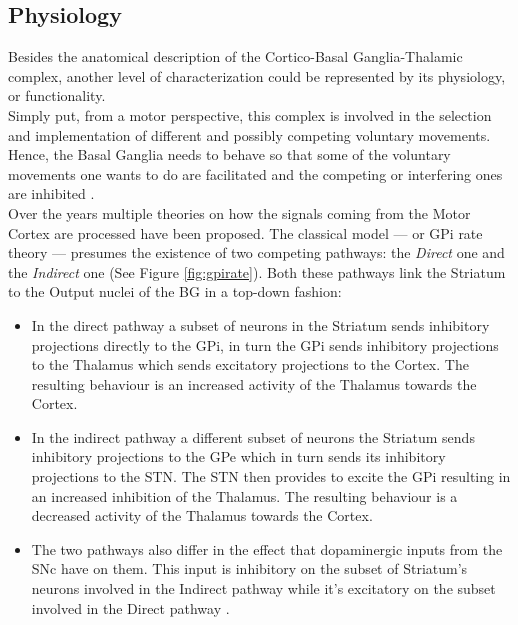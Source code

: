 \documentclass[MSc,english]{Container/thesistemplate}
\begin{document}
\subsection{Physiology}
Besides the anatomical description of the Cortico-Basal Ganglia-Thalamic complex, another level of characterization could be represented by its physiology, or functionality.
\\Simply put, from a motor perspective, this complex is involved in the selection and implementation of different and possibly competing voluntary movements. Hence, the Basal Ganglia needs to behave so that some of the voluntary movements one wants to do are facilitated and the competing or interfering ones are inhibited \cite{simonyan}.
\\Over the years multiple theories on how the signals coming from the Motor Cortex are processed have been proposed. The classical model --- or GPi rate theory --- presumes the existence of two competing pathways: the \emph{Direct} one and the \emph{Indirect} one (See Figure \ref{fig:gpirate}). Both these pathways link the Striatum to the Output nuclei of the BG in a top-down fashion: 

\begin{itemize}

\item In the direct pathway a subset of neurons in the Striatum sends inhibitory projections directly to the GPi, in turn the GPi sends inhibitory projections to the Thalamus which sends excitatory projections to the Cortex. The resulting behaviour is an increased activity of the Thalamus towards the Cortex.

\item In the indirect pathway a different subset of neurons the Striatum sends inhibitory projections to the GPe which in turn sends its inhibitory projections to the STN. The STN then provides to excite the GPi resulting in an increased inhibition of the Thalamus. The resulting behaviour is a decreased activity of the Thalamus towards the Cortex.

\item The two pathways also differ in the effect that dopaminergic inputs from the SNc have on them. This input is inhibitory on the subset of Striatum's neurons involved in the Indirect pathway while it's excitatory on the subset involved in the Direct pathway \cite{montgomery}.

\end{itemize}
\end{document}
